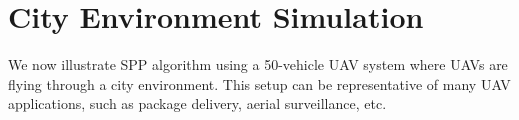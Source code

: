\section{City Environment Simulation \label{sec:city_sim}}
We now illustrate SPP algorithm using a 50-vehicle UAV system where UAVs are flying through a city environment. This setup can be representative of many UAV applications, such as package delivery, aerial surveillance, etc. 